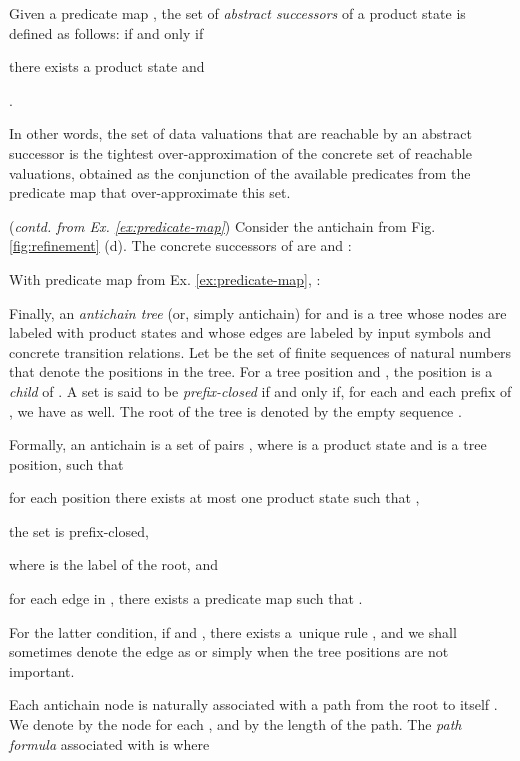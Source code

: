 \documentclass{llncs}
\begin{document}
Given a predicate map , the set  of
\emph{abstract successors} of a product state  is defined as
follows:  if and
only if \begin{inparaenum}[(i)]
\item there exists a product state  and
\item . 
\end{inparaenum}
In other words, the set of data valuations that are reachable by an
abstract successor is the tightest over-approximation of the concrete
set of reachable valuations, obtained as the conjunction of the
available predicates from the predicate map that over-approximate
this set.

\begin{example}(\emph{contd. from Ex. \ref{ex:predicate-map}}) 
Consider the antichain from Fig. \ref{fig:refinement} (d). The
concrete successors of  are
 and
:

\vspace*{-1mm}With predicate map  from Ex. \ref{ex:predicate-map}, 
:

\end{example}

Finally, an \emph{antichain tree} (or, simply antichain) 
for  and  is a tree whose nodes are labeled with
product states and whose edges are labeled by input symbols and
concrete transition relations. Let  be the set of finite
sequences of natural numbers that denote the positions in the
tree. For a tree position  and , the
position  is a \emph{child} of . A set  is
said to be \emph{prefix-closed} if and only if, for each  and
each prefix  of , we have  as well. The root of the
tree is denoted by the empty sequence .

Formally, an antichain  is a set of pairs ,
where  is a product state and  is a tree position, such
that\begin{inparaenum}[(1)]
\item for each position  there exists at most one
  product state  such that ,
\item the set  is
  prefix-closed, 
\item  where
   is the label of the root, and 
\item for each edge  in ,
  there exists a predicate map  such that .
\end{inparaenum}
For the latter condition, if  and
, there exists a~unique rule , and we shall
sometimes denote the edge as  or simply
 when the tree positions are not important.

Each antichain node  is naturally
associated with a path from the root to itself . We denote by  the node 
for each , and by  the length of the path.
The \emph{path formula} associated with  is  where
\end{document}
